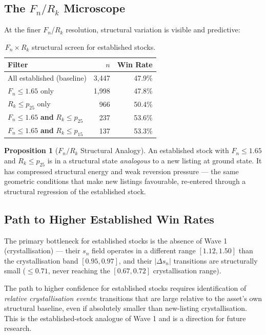 \documentclass[11pt, a4paper]{article}
\newcommand{\Fn}{F_n}
\newcommand{\sn}{s_n}
\newcommand{\Rk}{R_k}
\newcommand{\dsn}{|\Delta s_n|}
\theoremstyle{definition}
\newtheorem{proposition}{Proposition}
\begin{document}
\subsection{The $F_n / R_k$ Microscope}

At the finer $\Fn$/$\Rk$ resolution, structural variation is visible and
predictive:

\begin{table}[h!]
\centering
\caption{$F_n \times R_k$ structural screen for established stocks.}
\begin{tabular}{lrr}
\toprule
\textbf{Filter} & \textbf{$n$} & \textbf{Win Rate} \\
\midrule
All established (baseline)                                   & 3{,}447 & 47.9\% \\
$F_n \leq 1.65$ only                                         & 1{,}998 & 47.8\% \\
$\Rk \leq p_{25}$ only                                       & 966     & 50.4\% \\
$F_n \leq 1.65$ \textbf{and} $\Rk \leq p_{25}$              & 237     & 53.6\% \\
$F_n \leq 1.65$ \textbf{and} $\Rk \leq p_{15}$              & 137     & 53.3\% \\
\bottomrule
\end{tabular}
\end{table}

\begin{proposition}[$F_n / R_k$ Structural Analogy]
An established stock with $F_n \leq 1.65$ and $\Rk \leq p_{25}$ is in a
structural state \emph{analogous} to a new listing at ground state.
It has compressed structural energy and weak reversion pressure —
the same geometric conditions that make new listings favourable,
re-entered through a structural regression of the established stock.
\end{proposition}

\subsection{Path to Higher Established Win Rates}

The primary bottleneck for established stocks is the absence of
Wave 1 (crystallisation) — their $\sn$ field operates in a different range
$[1.12, 1.50]$ than the crystallisation band $[0.95, 0.97]$, and their
$\dsn$ transitions are structurally small ($\leq 0.71$, never reaching the
$[0.67, 0.72]$ crystallisation range).

The path to higher confidence for established stocks requires identification
of \emph{relative crystallisation events}: transitions that are large relative
to the asset's own structural baseline, even if absolutely smaller than
new-listing crystallisation.
This is the established-stock analogue of Wave 1 and is a direction for
future research.
\end{document}

